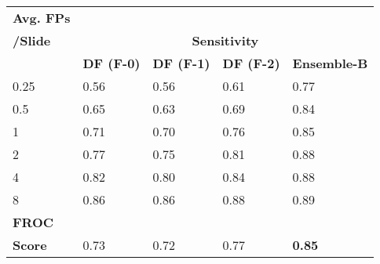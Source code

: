 \documentclass[times,twocolumn,final,authoryear]{tmp}
\begin{document}
\begin{table}[!h]
\begin{tabular}{@{}lllll@{}}
\textbf{Avg. FPs} &\\
\textbf{/Slide} & \multicolumn{4}{c}{\textbf{Sensitivity}}                                                                                                                                \\    
\textbf{}                 & \multicolumn{1}{c}{\textbf{DF (F-0)}} & \multicolumn{1}{c}{\textbf{DF (F-1)}} & \multicolumn{1}{c}{\textbf{DF (F-2)}} & \multicolumn{1}{c}{\textbf{Ensemble-B}} \\
0.25                      & 0.56                                     & 0.56                                     & 0.61                                     & 0.77                                    \\
0.5                       & 0.65                                     & 0.63                                     & 0.69                                     & 0.84                                    \\
1                         & 0.71                                     & 0.70                                     & 0.76                                     & 0.85                                    \\
2                         & 0.77                                     & 0.75                                     & 0.81                                     & 0.88                                    \\
4                         & 0.82                                     & 0.80                                     & 0.84                                     & 0.88                                    \\
8                         & 0.86                                     & 0.86                                     & 0.88                                     & 0.89                                    \\
\textbf{FROC} &&&\\
\textbf{Score}       & 0.73                                     & 0.72                                     & 0.77                                     & \textbf{0.85}                           \\  
\end{tabular}\end{table}
\end{document}
